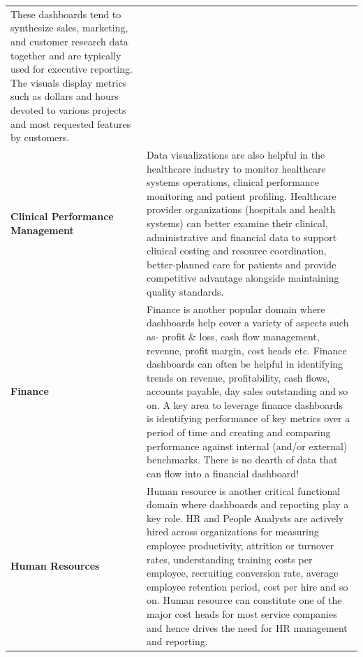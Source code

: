 \documentclass[]{book}
\begin{document}
\begin{longtable}[]{@{}ll@{}}
\begin{minipage}[t]{0.78\columnwidth}
These dashboards tend to synthesize sales, marketing, and customer
research data together and are typically used for executive reporting.
The visuals display metrics such as dollars and hours devoted to various
projects and most requested features by customers.\strut
\end{minipage}\tabularnewline
\begin{minipage}[t]{0.16\columnwidth}\raggedright\strut
\textbf{Clinical Performance Management}\strut
\end{minipage} & \begin{minipage}[t]{0.78\columnwidth}\raggedright\strut
Data visualizations are also helpful in the healthcare industry to
monitor healthcare systems operations, clinical performance monitoring
and patient profiling. Healthcare provider organizations (hospitals and
health systems) can better examine their clinical, administrative and
financial data to support clinical costing and resource coordination,
better-planned care for patients and provide competitive advantage
alongside maintaining quality standards.\strut
\end{minipage}\tabularnewline
\begin{minipage}[t]{0.16\columnwidth}\raggedright\strut
\textbf{Finance}\strut
\end{minipage} & \begin{minipage}[t]{0.78\columnwidth}\raggedright\strut
Finance is another popular domain where dashboards help cover a variety
of aspects such as- profit \& loss, cash flow management, revenue,
profit margin, cost heads etc. Finance dashboards can often be helpful
in identifying trends on revenue, profitability, cash flows, accounts
payable, day sales outstanding and so on. A key area to leverage finance
dashboards is identifying performance of key metrics over a period of
time and creating and comparing performance against internal (and/or
external) benchmarks. There is no dearth of data that can flow into a
financial dashboard!\strut
\end{minipage}\tabularnewline
\begin{minipage}[t]{0.16\columnwidth}\raggedright\strut
\textbf{Human Resources}\strut
\end{minipage} & \begin{minipage}[t]{0.78\columnwidth}\raggedright\strut
Human resource is another critical functional domain where dashboards
and reporting play a key role. HR and People Analysts are actively hired
across organizations for measuring employee productivity, attrition or
turnover rates, understanding training costs per employee, recruiting
conversion rate, average employee retention period, cost per hire and so
on. Human resource can constitute one of the major cost heads for most
service companies and hence drives the need for HR management and
reporting.\strut
\end{minipage}\tabularnewline
\bottomrule
\end{longtable}
\end{document}

